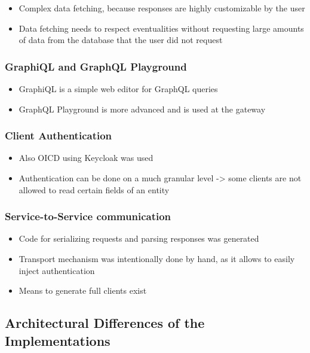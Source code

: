 \begin{itemize}
    \item Complex data fetching, because responses are highly customizable by the user
    \item Data fetching needs to respect eventualities without requesting large amounts of data from the database that the user did not request
\end{itemize}

\subsubsection{GraphiQL and GraphQL Playground}

\begin{itemize}
    \item GraphiQL is a simple web editor for GraphQL queries
    \item GraphQL Playground is more advanced and is used at the gateway
\end{itemize}

\subsubsection{Client Authentication}

\begin{itemize}
    \item Also OICD using Keycloak was used
    \item Authentication can be done on a much granular level -> some clients are not allowed to read certain fields of an entity
\end{itemize}

\subsubsection{Service-to-Service communication}

\begin{itemize}
    \item Code for serializing requests and parsing responses was generated
    \item Transport mechanism was intentionally done by hand, as it allows to easily inject authentication
    \item Means to generate full clients exist
\end{itemize}

\subsection{Architectural Differences of the Implementations}

